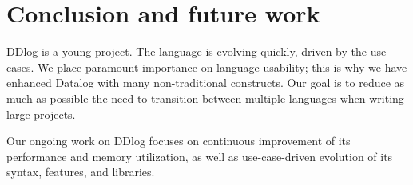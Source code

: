 \section{Conclusion and future work}\label{sec-conclusions}

DDlog is a young project.  The language is evolving quickly, driven by
the use cases.  We place paramount importance on language usability;
this is why we have enhanced Datalog with many non-traditional
constructs.  Our goal is to reduce as much as possible the need to
transition between multiple languages when writing large projects.

Our ongoing work on DDlog focuses on continuous improvement of its
performance and memory utilization, as well as use-case-driven evolution
of its syntax, features, and libraries.
